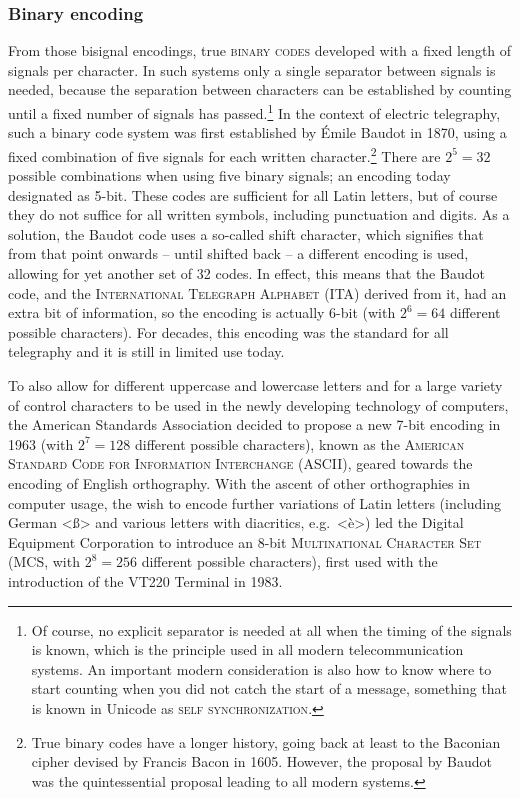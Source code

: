 \subsubsection*{Binary encoding}

From those bisignal encodings, true \textsc{binary codes} developed with a fixed
length of signals per character. In such systems only a single separator between
signals is needed, because the separation between characters can be established
by counting until a fixed number of signals has passed.\footnote{Of course, no
explicit separator is needed at all when the timing of the signals is known, which is
the principle used in all modern telecommunication systems. An important modern
consideration is also how to know where to start counting when you did not catch
the start of a message, something that is known in Unicode as \textsc{self
synchronization}.} In the context of electric telegraphy, such a binary code
system was first established by Émile Baudot in 1870, using a fixed combination
of five signals for each written character.\footnote{True binary codes have a
longer history, going back at least to the Baconian cipher devised by Francis
Bacon in 1605. However, the proposal by Baudot was the quintessential proposal
leading to all modern systems.} There are $2^5 = 32$ possible combinations when
using five binary signals; an encoding today designated as 5-bit. These
codes are sufficient for all Latin letters, but of course they do not suffice
for all written symbols, including punctuation and digits. As a solution, the
Baudot code uses a so-called shift character, which signifies that from
that point onwards -- until shifted back -- a different encoding is used, allowing
for yet another set of 32 codes. In effect, this means that the Baudot code, and
the \textsc{International Telegraph Alphabet} (ITA) derived from it, had an
extra bit of information, so the encoding is actually 6-bit (with $2^6
= 64$ different possible characters). For decades, this encoding was the
standard for all telegraphy and it is still in limited use today.

To also allow for different uppercase and lowercase letters and for a large
variety of control characters to be used in the newly developing technology of
computers, the American Standards Association decided to propose a new 7-bit
encoding in 1963 (with $2^7 = 128$ different possible characters), known as the
\textsc{American Standard Code for Information Interchange} (ASCII), geared
towards the encoding of English orthography. With the ascent of other
orthographies in computer usage, the wish to encode further variations of Latin
letters (including German <ß> and various letters with diacritics, e.g.\ <è>) led the
Digital Equipment Corporation to introduce an 8-bit \textsc{Multinational
Character Set} (MCS, with $2^8 = 256$ different possible characters), first used
with the introduction of the VT{\large 220} Terminal in 1983. 

